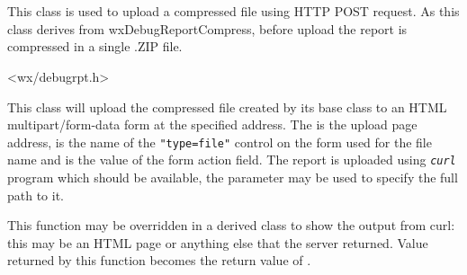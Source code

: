
\section{}\label{wxdebugreportupload}

This class is used to upload a compressed file using HTTP POST request. As this
class derives from wxDebugReportCompress, before upload the report is
compressed in a single .ZIP file.




<wx/debugrpt.h>



\label{wxdebugreportuploadwxdebugreportupload}


This class will upload the compressed file created by its base class to an HTML
multipart/form-data form at the specified address. The  is the upload
page address,  is the name of the \texttt{"type=file"} control on
the form used for the file name and  is the value of the form
action field. The report is uploaded using \texttt{\textit{curl}} program which
should be available, the  parameter may be used to specify the full
path to it.


\label{wxdebugreportuploadonserverreply}


This function may be overridden in a derived class to show the output from
curl: this may be an HTML page or anything else that the server returned.
Value returned by this function becomes the return value of 
.


